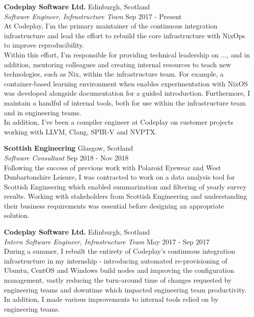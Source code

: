 \documentclass[a4paper]{article}
\begin{document}
\textbf{Codeplay Software Ltd.} \hfill {\color{gray} Edinburgh, Scotland} \\
\textit{Software Engineer, Infrastructure Team} \hfill {\color{gray} Sep 2017 - Present} \\
\vspace{2mm}
At Codeplay, I'm the primary maintainer of the continuous integration infrastructure and lead
the effort to rebuild the core infrastructure with NixOps to improve reproducibility. \\
\vspace{2mm}
Within this effort, I'm responsible for providing technical leadership on ..., and in addition,
mentoring colleagues and creating internal resources to teach new technologies, such as Nix, within
the infrastructure team. For example, a container-based learning environment when enables
experimentation with NixOS was developed alongside documentation for a guided introduction.
Furthermore, I maintain a handful of internal tools, both for use within the infrastructure team
and in engineering teams. \\
\vspace{2mm}
In addition, I've been a compiler engineer at Codeplay on customer projects working with LLVM,
Clang, SPIR-V and NVPTX.
\vspace{2mm}

\textbf{Scottish Engineering} \hfill {\color{gray} Glasgow, Scotland} \\
\textit{Software Consultant} \hfill {\color{gray} Sep 2018 - Nov 2018} \\
\vspace{2mm}
Following the success of previous work with Polaroid Eyewear and West Dunbartonshire Leisure, I
was contracted to work on a data analysis tool for Scottish Engineering which enabled summarization
and filtering of yearly survey results. Working with stakeholders from Scottish Engineering and
understanding their business requirements was essential before designing an appropriate solution.
\vspace{2mm}

\textbf{Codeplay Software Ltd.} \hfill {\color{gray} Edinburgh, Scotland} \\
\textit{Intern Software Engineer, Infrastructure Team} \hfill {\color{gray} May 2017 - Sep 2017} \\
\vspace{2mm}
During a summer, I rebuilt the entirety of Codeplay's continuous integration infrastructure
in my internship - introducing automated re-provisioning of Ubuntu, CentOS and Windows build nodes
and improving the configuration management, vastly reducing the turn-around time of changes
requested by engineering teams and downtime which impacted engineering team productivity. In
addition, I made various improvements to internal tools relied on by engineering teams.
\vspace{2mm}
\end{document}
